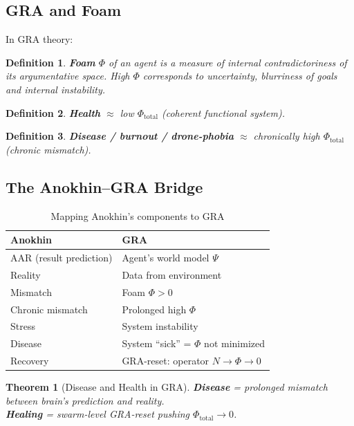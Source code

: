 \documentclass[11pt,a4paper]{article}
\newtheorem{theorem}{Theorem}
\newtheorem{definition}{Definition}
\begin{document}
\subsection{GRA and Foam}

In GRA theory:

\begin{definition}
\textbf{Foam} $\Phi$ of an agent is a measure of internal contradictoriness of its argumentative space. High $\Phi$ corresponds to uncertainty, blurriness of goals and internal instability.
\end{definition}

\begin{definition}
\textbf{Health} $\approx$ low $\Phi_{\text{total}}$ (coherent functional system).
\end{definition}

\begin{definition}
\textbf{Disease / burnout / drone-phobia} $\approx$ chronically high $\Phi_{\text{total}}$ (chronic mismatch).
\end{definition}

\subsection{The Anokhin--GRA Bridge}

\begin{table}[h]
\centering
\caption{Mapping Anokhin's components to GRA}
\begin{tabular}{ll}
\toprule
\textbf{Anokhin} & \textbf{GRA} \\
\midrule
AAR (result prediction) & Agent's world model $\Psi$ \\
Reality & Data from environment \\
Mismatch & Foam $\Phi > 0$ \\
Chronic mismatch & Prolonged high $\Phi$ \\
Stress & System instability \\
Disease & System ``sick'' = $\Phi$ not minimized \\
Recovery & GRA-reset: operator $N \to \Phi \to 0$ \\
\bottomrule
\end{tabular}
\end{table}

\begin{theorem}[Disease and Health in GRA]
\textbf{Disease} = prolonged mismatch between brain's prediction and reality. \\
\textbf{Healing} = swarm-level GRA-reset pushing $\Phi_{\text{total}} \to 0$.
\end{theorem}
\end{document}
